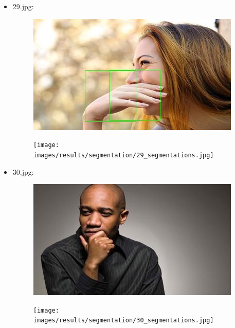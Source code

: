\begin{itemize}
\begin{figure}[!htb]
\begin{minipage}{0.5\textwidth}
            \end{minipage}
        \end{figure}
    \item 29.jpg:
        \begin{figure}[!htb]
            \begin{minipage}{0.5\textwidth}
                \centering
                \includegraphics[scale = 0.68]{images/results/detection/29_detections.jpg}
            \end{minipage}\hfill
            \begin{minipage}{0.5\textwidth}
                \centering
                \texttt{[image: images/results/segmentation/29\_segmentations.jpg]}
            \end{minipage}
        \end{figure}
    \newpage
     \item 30.jpg:
        \begin{figure}[!htb]
            \begin{minipage}{0.5\textwidth}
                \centering
                \includegraphics[scale = 0.68]{images/results/detection/30_detections.jpg}
            \end{minipage}\hfill
            \begin{minipage}{0.5\textwidth}
                \centering
                \texttt{[image: images/results/segmentation/30\_segmentations.jpg]}
            \end{minipage}
        \end{figure}
\end{itemize} 
